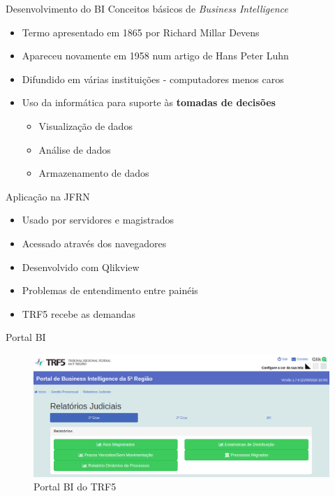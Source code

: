 \documentclass[10pt,t]{beamer}
\begin{document}
\begin{frame}{Desenvolvimento do BI}\label{colorpalette}
\vspace{8pt}
Conceitos básicos de \textit{Business Intelligence}
    \begin{itemize}
        \item Termo apresentado em 1865 por Richard Millar Devens
        \item Apareceu novamente em 1958 num artigo de Hans Peter Luhn
    	\item Difundido em várias instituições - computadores menos caros
    	\item Uso da informática para suporte às \textbf{tomadas de decisões}
    	\begin{itemize}
    		\item Visualização de dados
    		\item Análise de dados
    		\item Armazenamento de dados
    	\end{itemize}
    \end{itemize}
\end{frame} 


\begin{frame}{Aplicação na JFRN}\label{colorpalette}
\vspace{8pt}
    \begin{itemize}
    	\item Usado por servidores e magistrados
    	\item Acessado através dos navegadores
    	\item Desenvolvido com Qlikview
    	\item Problemas de entendimento entre painéis
    	\item TRF5 recebe as demandas
    \end{itemize}
\end{frame} 


\begin{frame}{Portal BI}\label{colorpalette}
	\vspace{8pt}
	\begin{figure}
		\centering
		\includegraphics[scale=0.25]{./imagens/portal_bi.png}
		\caption{Portal BI do TRF5}
	\end{figure}
\end{frame} 
\end{document}
